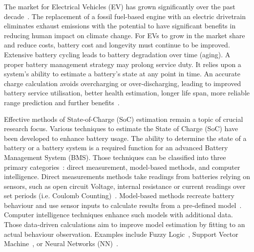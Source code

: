 The market for Electrical Vehicles (EV) has grown significantly over the past decade~\cite{state-ev-australia}.
The replacement of a fossil fuel-based engine with an electric drivetrain eliminates exhaust emissions with the potential to have significant benefits in reducing human impact on climate change.
For EVs to grow in the market share and reduce costs, battery cost and longevity must continue to be improved.
Extensive battery cycling leads to battery degradation over time (aging).
A proper battery management strategy may prolong service duty.
It relies upon a system's ability to estimate a battery's state at any point in time.
An accurate charge calculation avoids overcharging or over-discharging, leading to improved battery service utilisation, better health estimation, longer life span, more reliable range prediction and further benefits~\cite{calif_proper_2008}.

%
%
Effective methods of State-of-Charge (SoC) estimation remain a topic of crucial research focus.
Various techniques to estimate the State of Charge (SoC) have been developed to enhance battery usage.
The ability to determine the state of a battery or a battery system is a required function for an advanced Battery Management System (BMS).
Those techniques can be classified into three primary categories~\cite{ali_towards_2019,ng_enhanced_2009,robust_SoC,6953745}: direct measurement, model-based methods, and computer intelligence.
Direct measurements methods take readings from batteries relying on sensors, such as open circuit Voltage, internal resistance or current readings over set periods (i.e. Coulomb Counting)~\cite{ng_enhanced_2009,robust_SoC}.
Model-based methods recreate battery behaviour and use sensor inputs to calculate results from a pre-defined model~\cite{6953745}.
Computer intelligence techniques enhance such models with additional data.
Those data-driven calculations aim to improve model estimation by fitting to an actual behaviour observation.
Examples include Fuzzy Logic~\cite{malkhandi_fuzzy_2006}, Support Vector Machine~\cite{hansen_support_2005, anton_battery_2013}, or Neural Networks (NN)~\cite{song_lithium-ion_2018,Chemali2017,mamo_long_2020,jiao_gru-rnn_2020,xiao_accurate_2019,javid_adaptive_2020,zhang_deep_2020}.


